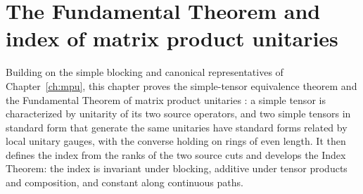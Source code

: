 \chapter{The Fundamental Theorem and index of matrix product unitaries}
\label{ch:mpu_fundamental_theorem}

Building on the simple blocking and canonical representatives of
Chapter~\ref{ch:mpu}, this chapter proves the simple-tensor equivalence
theorem and the Fundamental Theorem of matrix product unitaries
\cite{Cirac2017MPU}: a simple tensor is characterized by unitarity of its two
source operators, and two simple tensors in standard form that generate the
same unitaries have standard forms related by local unitary gauges, with the
converse holding on rings of even length. It then defines the index from the
ranks of the two source cuts and develops the Index Theorem: the index is
invariant under blocking, additive under tensor products and composition, and
constant along continuous paths.


